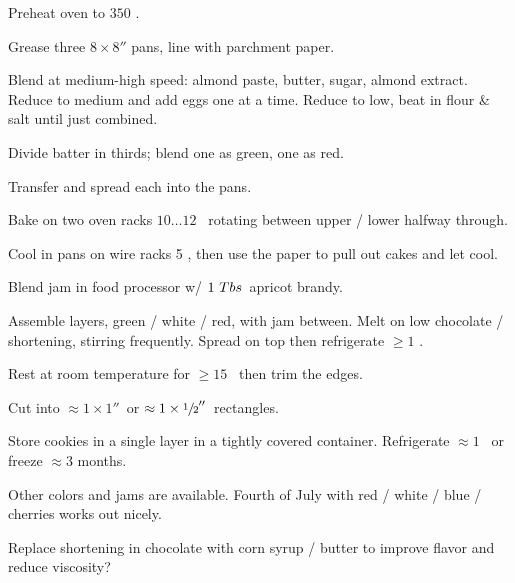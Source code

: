 \begin{preparation}
\item Preheat oven to $350$ \Fahrenheit.

\item Grease three $8\times8''$ pans, line with parchment paper.

\item Blend at medium-high speed: almond paste, butter, sugar, almond extract.
    Reduce to medium and add eggs one at a time.
    Reduce to low, beat in flour \& salt until just combined.

\item Divide batter in thirds; blend one as green, one as red.

\item Transfer and spread each into the pans.

\item Bake on two oven racks $10 \dots 12$ \minute~rotating between upper /
    lower halfway through.

\item Cool in pans on wire racks 5 \minute,
    then use the paper to pull out cakes and let cool.

\item Blend jam in food processor w/ $1~Tbs$~apricot brandy.

\item Assemble layers, green / white / red, with jam between.
    Melt on low chocolate / shortening, stirring frequently.
    Spread on top then refrigerate $\geq1$ \hour.

\item Rest at room temperature for $\geq 15$ \minute~then trim the edges.

\item Cut into $\approx 1\times 1''$~or $\approx 1\times \sfrac{1}{2}''$~rectangles.

\item Store cookies in a single layer in a tightly covered container.
    Refrigerate $\approx 1$ \week~or freeze $\approx 3$ months.
\end{preparation}

\begin{variation}
\item Other colors and jams are available.
    Fourth of July with red / white / blue / cherries works out nicely.
\end{variation}

\begin{experiments}
\item Replace shortening in chocolate with corn syrup / butter to improve
    flavor and reduce viscosity?
\end{experiments}

\recipeend%
